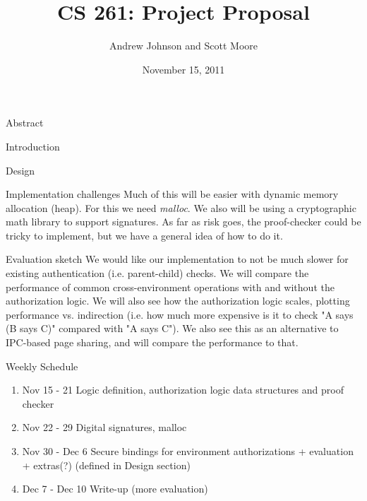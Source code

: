\documentclass[10pt]{article}
\begin{document}
\title{CS 261: Project Proposal}
\author{Andrew Johnson and Scott Moore}
\date{November 15, 2011}

\maketitle

\thispagestyle{empty}

\begin{comment}

\begin{problem}{Problem Title}
Problem Statement
\newline\newline
\textbf{\emph{Solution}}:
\newline\newline
Solution goes here
\end{problem}

\end{comment}

\begin{section}{Abstract}
\end{section}

\begin{section}{Introduction}
\end{section}

\begin{section}{Design}
\end{section}

\begin{section}{Implementation challenges}
Much of this will be easier with dynamic memory allocation (heap).  
For this we need \emph{malloc}.  
We also will be using a cryptographic math library to support signatures. 
As far as risk goes, the proof-checker could be tricky to implement, but we have a general idea of how to do it.
\end{section}

\begin{section}{Evaluation sketch}
We would like our implementation to not be much slower for existing authentication (i.e. parent-child) checks.  
We will compare the performance of common cross-environment operations with and without the authorization logic.  
We will also see how the authorization logic scales, plotting performance vs. indirection (i.e. how much more expensive is it to check "A says (B says C)" compared with "A says C").
We also see this as an alternative to IPC-based page sharing, and will compare the performance to that.
\end{section}

\begin{section}{Weekly Schedule}
\begin{enumerate}
\item Nov 15 - 21 Logic definition, authorization logic data structures and proof checker
\item Nov 22 - 29 Digital signatures, malloc
\item Nov 30 - Dec 6 Secure bindings for environment authorizations + evaluation + extras(?) (defined in Design section)
\item Dec 7 - Dec 10 Write-up (more evaluation)
\end{enumerate}
\end{section}
\end{document}
